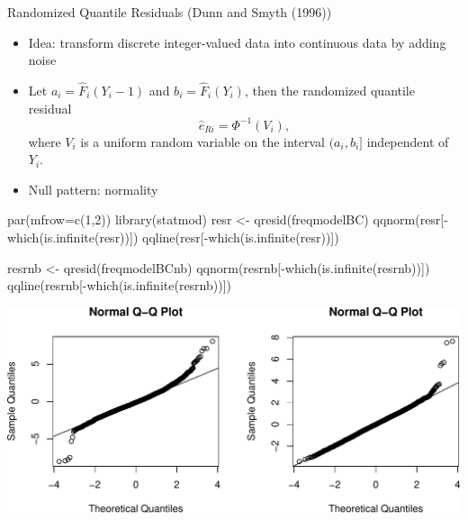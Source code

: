 \documentclass[
  ignorenonframetext,
]{beamer}
\newenvironment{Shaded}{\begin{snugshade}}{\end{snugshade}}
\newcommand{\AttributeTok}[1]{\textcolor[rgb]{0.77,0.63,0.00}{#1}}
\newcommand{\DecValTok}[1]{\textcolor[rgb]{0.00,0.00,0.81}{#1}}
\newcommand{\FunctionTok}[1]{\textcolor[rgb]{0.00,0.00,0.00}{#1}}
\newcommand{\NormalTok}[1]{#1}
\newcommand{\OtherTok}[1]{\textcolor[rgb]{0.56,0.35,0.01}{#1}}
\newcommand{\SpecialCharTok}[1]{\textcolor[rgb]{0.00,0.00,0.00}{#1}}
\begin{document}
\begin{frame}{Randomized Quantile Residuals (Dunn and Smyth (1996))}
\protect\hypertarget{randomized-quantile-residuals-dunn1996randomized}{}
\begin{itemize}
    \item Idea: transform discrete integer-valued data into continuous data by adding noise
    \item Let $a_i = \hat{F}_i(Y_i-1)$ and $b_i = \hat{F}_i(Y_i)$, then the randomized quantile
    residual
    $$ \hat{e}_{Ri} = \Phi^{-1} (V_i),$$
    where $V_i$ is a uniform random variable on the interval $(a_i,b_i]$ independent of $Y_i$.
    \item Null pattern: normality
\end{itemize}
\end{frame}

\begin{frame}[fragile]{}
\protect\hypertarget{section-6}{}
\scriptsize

\begin{Shaded}
\begin{Highlighting}[]
\FunctionTok{par}\NormalTok{(}\AttributeTok{mfrow=}\FunctionTok{c}\NormalTok{(}\DecValTok{1}\NormalTok{,}\DecValTok{2}\NormalTok{))}
\FunctionTok{library}\NormalTok{(statmod)}
\NormalTok{resr }\OtherTok{\textless{}{-}} \FunctionTok{qresid}\NormalTok{(freqmodelBC)}
\FunctionTok{qqnorm}\NormalTok{(resr[}\SpecialCharTok{{-}}\FunctionTok{which}\NormalTok{(}\FunctionTok{is.infinite}\NormalTok{(resr))])}
\FunctionTok{qqline}\NormalTok{(resr[}\SpecialCharTok{{-}}\FunctionTok{which}\NormalTok{(}\FunctionTok{is.infinite}\NormalTok{(resr))])}

\NormalTok{resrnb }\OtherTok{\textless{}{-}} \FunctionTok{qresid}\NormalTok{(freqmodelBCnb)}
\FunctionTok{qqnorm}\NormalTok{(resrnb[}\SpecialCharTok{{-}}\FunctionTok{which}\NormalTok{(}\FunctionTok{is.infinite}\NormalTok{(resrnb))])}
\FunctionTok{qqline}\NormalTok{(resrnb[}\SpecialCharTok{{-}}\FunctionTok{which}\NormalTok{(}\FunctionTok{is.infinite}\NormalTok{(resrnb))])}
\end{Highlighting}
\end{Shaded}

\includegraphics{week8_p1_files/figure-beamer/unnamed-chunk-11-1.pdf}
\end{frame}
\end{document}
